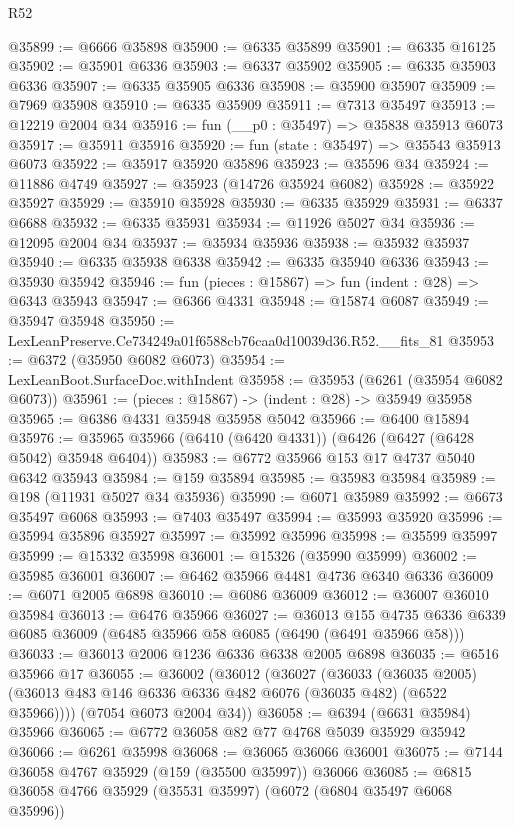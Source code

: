 \begin{lexlean}{R52}
\begin{coremodule}
@35899 := @6666 @35898
@35900 := @6335 @35899
@35901 := @6335 @16125
@35902 := @35901 @6336
@35903 := @6337 @35902
@35905 := @6335 @35903 @6336
@35907 := @6335 @35905 @6336
@35908 := @35900 @35907
@35909 := @7969 @35908
@35910 := @6335 @35909
@35911 := @7313 @35497
@35913 := @12219 @2004 @34
@35916 := fun (__p0 : @35497) => @35838 @35913 @6073
@35917 := @35911 @35916
@35920 := fun (state : @35497) => @35543 @35913 @6073
@35922 := @35917 @35920 @35896
@35923 := @35596 @34
@35924 := @11886 @4749
@35927 := @35923 (@14726 @35924 @6082)
@35928 := @35922 @35927
@35929 := @35910 @35928
@35930 := @6335 @35929
@35931 := @6337 @6688
@35932 := @6335 @35931
@35934 := @11926 @5027 @34
@35936 := @12095 @2004 @34
@35937 := @35934 @35936
@35938 := @35932 @35937
@35940 := @6335 @35938 @6338
@35942 := @6335 @35940 @6336
@35943 := @35930 @35942
@35946 := fun (pieces : @15867) => fun (indent : @28) => @6343 @35943
@35947 := @6366 @4331
@35948 := @15874 @6087
@35949 := @35947 @35948
@35950 := LexLeanPreserve.Ce734249a01f6588cb76caa0d10039d36.R52.__fits_81
@35953 := @6372 (@35950 @6082 @6073)
@35954 := LexLeanBoot.SurfaceDoc.withIndent
@35958 := @35953 (@6261 (@35954 @6082 @6073))
@35961 := (pieces : @15867) -> (indent : @28) -> @35949 @35958
@35965 := @6386 @4331 @35948 @35958 @5042
@35966 := @6400 @15894
@35976 := @35965 @35966 (@6410 (@6420 @4331)) (@6426 (@6427 (@6428 @5042) @35948 @6404))
@35983 := @6772 @35966 @153 @17 @4737 @5040 @6342 @35943
@35984 := @159 @35894
@35985 := @35983 @35984
@35989 := @198 (@11931 @5027 @34 @35936)
@35990 := @6071 @35989
@35992 := @6673 @35497 @6068
@35993 := @7403 @35497
@35994 := @35993 @35920
@35996 := @35994 @35896 @35927
@35997 := @35992 @35996
@35998 := @35599 @35997
@35999 := @15332 @35998
@36001 := @15326 (@35990 @35999)
@36002 := @35985 @36001
@36007 := @6462 @35966 @4481 @4736 @6340 @6336
@36009 := @6071 @2005 @6898
@36010 := @6086 @36009
@36012 := @36007 @36010 @35984
@36013 := @6476 @35966
@36027 := @36013
    @155
    @4735
    @6336
    @6339
    @6085
    @36009
    (@6485 @35966 @58 @6085 (@6490 (@6491 @35966 @58)))
@36033 := @36013 @2006 @1236 @6336 @6338 @2005 @6898
@36035 := @6516 @35966 @17
@36055 := @36002
    (@36012
      (@36027
        (@36033
          (@36035 @2005)
          (@36013 @483 @146 @6336 @6336 @482 @6076 (@36035 @482) (@6522 @35966))))
      (@7054 @6073 @2004 @34))
@36058 := @6394 (@6631 @35984) @35966
@36065 := @6772 @36058 @82 @77 @4768 @5039 @35929 @35942
@36066 := @6261 @35998
@36068 := @36065 @36066 @36001
@36075 := @7144 @36058 @4767 @35929 (@159 (@35500 @35997)) @36066
@36085 := @6815 @36058 @4766 @35929 (@35531 @35997) (@6072 (@6804 @35497 @6068 @35996))

\end{coremodule}
\end{lexlean}
